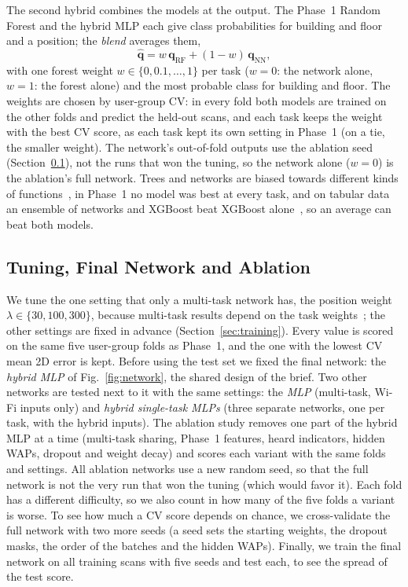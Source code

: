 The second hybrid combines the models at the output. The Phase~1 Random
Forest and the hybrid MLP each give class probabilities for building and
floor and a position; the \emph{blend} averages them,
\begin{equation}
  \hat{\mathbf{q}}=w\,\mathbf{q}_{\mathrm{RF}}+(1-w)\,\mathbf{q}_{\mathrm{NN}},
  \label{eq:blend}
\end{equation}
with one forest weight $w\in\{0,0.1,\dots,1\}$ per task ($w=0$: the network
alone, $w=1$: the forest alone) and the most probable class for building and
floor. The weights are chosen by user-group CV: in every fold both models are
trained on the other folds and predict the held-out scans, and each task keeps
the weight with the best CV score, as each task kept its own setting in
Phase~1 (on a tie, the smaller weight). The network's out-of-fold outputs use
the ablation seed (Section~\ref{sec:tuning}), not the runs that won the tuning,
so the network alone ($w=0$) is the ablation's full network. Trees and networks
are biased towards different kinds of functions~\cite{grinsztajn2022tree}, in
Phase~1 no model was best at every task, and on tabular data an ensemble of
networks and XGBoost beat XGBoost alone~\cite{shwartzziv2022tabular}, so an
average can beat both models.

\subsection{Tuning, Final Network and Ablation}\label{sec:tuning}
We tune the one setting that only a multi-task network has, the position
weight $\lambda\in\{30,100,300\}$, because multi-task results depend on the task
weights~\cite{kendall2018multi}; the other settings are fixed in advance
(Section~\ref{sec:training}). Every value is scored on the same five user-group
folds as Phase~1, and the one with the lowest CV mean 2D error is kept. Before using the test set we fixed the final network: the \emph{hybrid
MLP} of Fig.~\ref{fig:network}, the shared design of the brief. Two other
networks are tested next to it with the same settings: the \emph{MLP}
(multi-task, Wi-Fi inputs only) and \emph{hybrid single-task MLPs} (three
separate networks, one per task, with the hybrid inputs). The ablation study removes one part of the
hybrid MLP at a time (multi-task sharing, Phase~1 features, heard indicators,
hidden WAPs, dropout and weight decay) and scores each variant with the same
folds and settings. All ablation networks use a new random seed, so that the
full network is not the very run that won the tuning (which would favor it).
Each fold has a different difficulty, so we also count in how many of the five
folds a variant is worse. To see how much a CV score depends on chance, we
cross-validate the full network with two more seeds (a seed sets the starting
weights, the dropout masks, the order of the batches and the hidden WAPs). Finally, we train the final network on all
training scans with five seeds and test each, to see the spread of the test
score.

